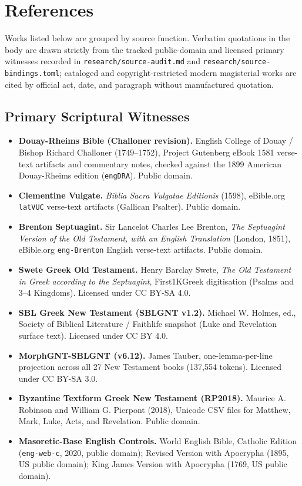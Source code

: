 \section{References}

Works listed below are grouped by source function. Verbatim quotations in the body are drawn strictly from the tracked public-domain and licensed primary witnesses recorded in \texttt{research/source-audit.md} and \texttt{research/source-bindings.toml}; cataloged and copyright-restricted modern magisterial works are cited by official act, date, and paragraph without manufactured quotation.

\subsection{Primary Scriptural Witnesses}

\begin{itemize}
  \item \textbf{Douay-Rheims Bible (Challoner revision).} English College of Douay / Bishop Richard Challoner (1749--1752), Project Gutenberg eBook 1581 verse-text artifacts and commentary notes, checked against the 1899 American Douay-Rheims edition (\texttt{engDRA}). Public domain.
  \item \textbf{Clementine Vulgate.} \textit{Biblia Sacra Vulgatae Editionis} (1598), eBible.org \texttt{latVUC} verse-text artifacts (Gallican Psalter). Public domain.
  \item \textbf{Brenton Septuagint.} Sir Lancelot Charles Lee Brenton, \textit{The Septuagint Version of the Old Testament, with an English Translation} (London, 1851), eBible.org \texttt{eng-Brenton} English verse-text artifacts. Public domain.
  \item \textbf{Swete Greek Old Testament.} Henry Barclay Swete, \textit{The Old Testament in Greek according to the Septuagint}, First1KGreek digitisation (Psalms and 3--4 Kingdoms). Licensed under CC BY-SA 4.0.
  \item \textbf{SBL Greek New Testament (SBLGNT v1.2).} Michael W. Holmes, ed., Society of Biblical Literature / Faithlife snapshot (Luke and Revelation surface text). Licensed under CC BY 4.0.
  \item \textbf{MorphGNT-SBLGNT (v6.12).} James Tauber, one-lemma-per-line projection across all 27 New Testament books (137,554 tokens). Licensed under CC BY-SA 3.0.
  \item \textbf{Byzantine Textform Greek New Testament (RP2018).} Maurice A. Robinson and William G. Pierpont (2018), Unicode CSV files for Matthew, Mark, Luke, Acts, and Revelation. Public domain.
  \item \textbf{Masoretic-Base English Controls.} World English Bible, Catholic Edition (\texttt{eng-web-c}, 2020, public domain); Revised Version with Apocrypha (1895, US public domain); King James Version with Apocrypha (1769, US public domain).
\end{itemize}

